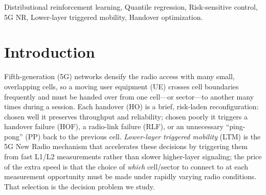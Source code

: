 \documentclass[conference]{IEEEtran}
\begin{document}
\begin{abstract}
Handover (HO) decisions in 5G-Advanced lower-layer-triggered mobility (LTM) must
balance throughput against reliability under fast-varying radio conditions, where
rare but costly events---handover and radio-link failures---dominate the user
experience. We cast LTM HO as a Markov decision process and study distributional
reinforcement learning (QR-DQN) with risk-aware action selection. We report two
separable improvements over scalar DQN. First, the distributional learning target
alone lowers the handover, ping-pong and failure rates at equal reward per
decision. Second, a Conditional-Value-at-Risk (CVaR) policy that acts on the lower
tail of the return distribution drives the failure tails down further; the degree
of risk aversion is a single monotone dial that trades a small amount of reward for
reliability, with a knee at CVaR level $\alpha\approx0.25$. We further show that the
tail is best summarized by a single dedicated quantile: an agent that trains and
acts on one quantile at $\tau=\alpha/2$ attains the lowest failure rates of any
learned agent at the output size and inference cost of scalar DQN. On a
$1{,}000$-trajectory 5G LTM benchmark this risk-aware agent cuts the
handover-failure rate of DQN by $40\%$, improves on a hand-tuned LTM
baseline---evaluated in the same simulator---on every user-facing and safety KPI
while issuing fewer handovers, and improves on a published contextual-bandit
baseline in capacity, reliability and handover failures.
\end{abstract}

\begin{IEEEkeywords}
Distributional reinforcement learning, Quantile regression, Risk-sensitive control, 5G NR, Lower-layer triggered mobility,
Handover optimization.
\end{IEEEkeywords}


\section{Introduction}

Fifth-generation (5G) networks densify the radio access with many small, overlapping cells, so a moving user equipment (UE) crosses cell boundaries frequently and must be handed over from one cell---or sector---to another many times during a session.
Each handover (HO) is a brief, risk-laden reconfiguration: chosen well it preserves throughput and reliability; chosen poorly it triggers a handover failure (HOF), a radio-link failure (RLF), or an unnecessary ``ping-pong'' (PP) back to the previous cell.
\emph{Lower-layer triggered mobility} (LTM) is the 5G New Radio mechanism that accelerates these decisions by triggering them from fast L1/L2 measurements rather than slower higher-layer signaling; the price of the extra speed is that the choice of \emph{which} cell/sector to connect to at each measurement opportunity must be made under rapidly varying radio conditions.
That selection is the decision problem we study.
\end{document}
